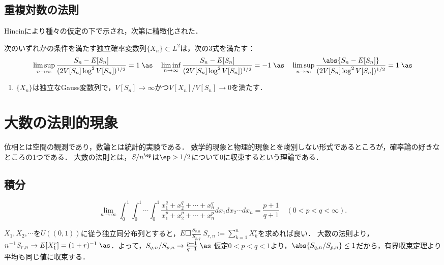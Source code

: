 \documentclass[uplatex,dvipdfmx]{jsreport}
\begin{document}
\subsection{重複対数の法則}

\begin{tcolorbox}[colframe=ForestGreen, colback=ForestGreen!10!white,breakable,colbacktitle=ForestGreen!40!white,coltitle=black,fonttitle=\bfseries\sffamily,
title=]
    Hincinにより種々の仮定の下で示され，次第に精緻化された．
\end{tcolorbox}

\begin{theorem}
    次のいずれかの条件を満たす独立確率変数列$\{X_n\}\subset L^2$は，次の3式を満たす：
    \[\limsup_{n\to\infty}\frac{S_n-E[S_n]}{(2V[S_n]\log^2V[S_n])^{1/2}}=1\;\as\quad\liminf_{n\to\infty}\frac{S_n-E[S_n]}{(2V[S_n]\log^2V[S_n])^{1/2}}=-1\;\as\quad\limsup_{n\to\infty}\frac{\abs{S_n-E[S_n]}}{(2V[S_n]\log^2V[S_n])^{1/2}}=1\;\as\]
    \begin{enumerate}
        \item $\{X_n\}$は独立なGauss変数列で，$V[S_n]\to\infty$かつ$V[X_n]/V[S_n]\to0$を満たす．
    \end{enumerate}
\end{theorem}

\section{大数の法則的現象}

\begin{tcolorbox}[colframe=ForestGreen, colback=ForestGreen!10!white,breakable,colbacktitle=ForestGreen!40!white,coltitle=black,fonttitle=\bfseries\sffamily,
title=]
    位相とは空間の観測であり，数論とは統計的実験である．
    数学的現象と物理的現象とを峻別しない形式であるところが，確率論の好きなところの1つである．
    大数の法則とは，$S/n^{\ep}$は$\ep>1/2$について$0$に収束するという理論である．
\end{tcolorbox}

\subsection{積分}

\begin{proposition}
    \[\lim_{n\to\infty}\int^1_0\int^1_0\cdots\int^1_0\frac{x_1^q+x_2^q+\cdots+x_n^q}{x_1^p+x_2^p+\cdots+x_n^p}dx_1dx_2\cdots dx_n=\frac{p+1}{q+1}\quad(0<p<q<\infty).\]
\end{proposition}
\begin{Proof}
    $X_1,X_2,\cdots$を$U((0,1))$に従う独立同分布列とすると，$E\Square{\frac{S_{q,n}}{S_{p,q}}}\;S_{r,n}:=\sum^n_{k=1}X_k^r$を求めれば良い．
    大数の法則より，$n^{-1}S_{r,n}\to E[X_1^r]=(1+r)^{-1}\;\as$．よって，$S_{q,n}/S_{p,n}\to\frac{p+1}{q+1}\;\as$
    仮定$0<p<q<1$より，$\abs{S_{q,n}/S_{p,n}}\le1$だから，有界収束定理より平均も同じ値に収束する．
\end{Proof}
\end{document}
